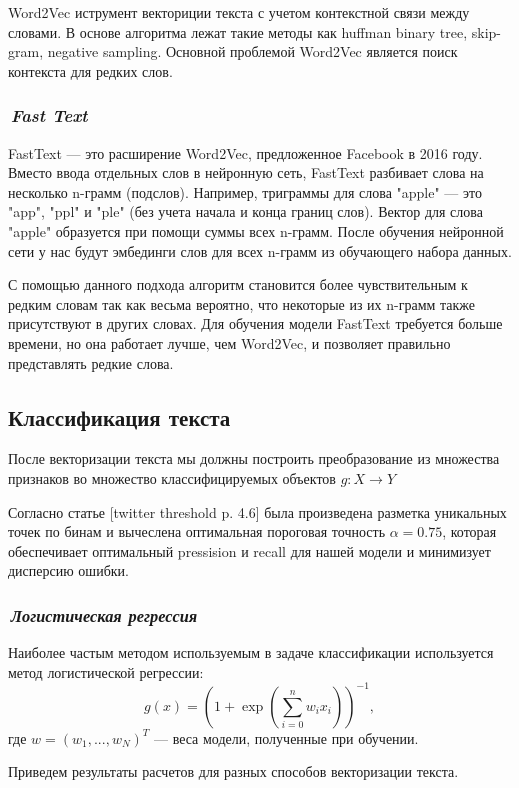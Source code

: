 \documentclass[12pt]{article}
\begin{document}
Word2Vec иструмент векториции текста с учетом контекстной связи между словами. В основе алгоритма лежат такие методы как huffman binary tree, skip-gram, negative sampling. Основной проблемой Word2Vec является поиск контекста для редких слов.

\subsubsection*{\it\,Fast Text}

FastText --- это расширение Word2Vec, предложенное Facebook в 2016 году. Вместо ввода отдельных слов в нейронную сеть, FastText разбивает слова на несколько n-грамм (подслов). Например, триграммы для слова "apple"  ---  это "app", "ppl" и "ple" (без учета начала и конца границ слов). Вектор для слова "apple" образуется при помощи суммы всех n-грамм. После обучения нейронной сети у нас будут эмбединги слов для всех n-грамм из обучающего набора данных.

С помощью данного подхода алгоритм становится более чувствительным к редким словам так как весьма вероятно, что некоторые из их n-грамм также присутствуют в других словах. Для обучения модели FastText требуется больше времени, но она работает лучше, чем Word2Vec, и позволяет правильно представлять редкие слова.

\subsection*{Классификация текста}
После векторизации текста мы должны построить преобразование из множества признаков во множество классифицируемых объектов $g: X \rightarrow Y$ 

Согласно статье [twitter threshold p. 4.6] была произведена разметка уникальных точек по бинам и вычеслена оптимальная пороговая точность $\alpha = 0.75$, которая обеспечивает оптимальный pressision и recall для нашей модели и минимизует дисперсию ошибки.

\subsubsection*{\it\,Логистическая регрессия}
Наиболее частым методом используемым в задаче классификации используется метод логистической регрессии:
$$
g(x) = \left(1 + \exp{ \left( \sum_{i=0}^n w_i x_i  \right) }\right)^{-1},
$$
где $w=(w_1, ..., w_N)^T$ --- веса модели, полученные при обучении.

Приведем результаты расчетов для разных способов векторизации текста.
\end{document}
